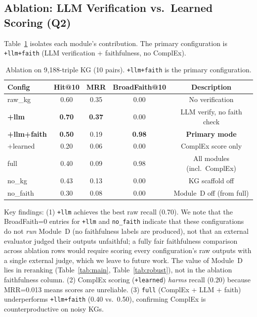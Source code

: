 \subsection{Ablation: LLM Verification vs.\ Learned Scoring (Q2)}
\label{sec:exp:ablation}

Table~\ref{tab:ablation} isolates each module's contribution. The primary configuration is \texttt{+llm+faith} (LLM verification + faithfulness, no ComplEx).

\begin{table}[tb]
  \centering
  \caption{Ablation on 9{,}188-triple KG (10 pairs). \texttt{+llm+faith} is the primary configuration.}
  \label{tab:ablation}
  \small
  \begin{tabular}{lcccc}
    \toprule
    Config & Hit@10 & MRR & BroadFaith@10 & Description \\
    \midrule
    raw\_kg & 0.60 & 0.35 & 0.00 & No verification \\
    \textbf{+llm} & \textbf{0.70} & \textbf{0.37} & 0.00 & LLM verify, no faith check \\
    \textbf{+llm+faith} & \textbf{0.50} & 0.19 & \textbf{0.98} & \textbf{Primary mode} \\
    +learned & 0.20 & 0.06 & 0.00 & ComplEx score only \\
    full & 0.40 & 0.09 & 0.98 & All modules (incl.\ ComplEx) \\
    no\_kg & 0.43 & 0.13 & 0.00 & KG scaffold off \\
    no\_faith & 0.30 & 0.08 & 0.00 & Module~D off (from full) \\
    \bottomrule
  \end{tabular}
\end{table}

Key findings: (1) \texttt{+llm} achieves the best raw recall (0.70). We note that the BroadFaith=0 entries for \texttt{+llm} and \texttt{no\_faith} indicate that these configurations do not \emph{run} Module~D (no faithfulness labels are produced), not that an external evaluator judged their outputs unfaithful; a fully fair faithfulness comparison across ablation rows would require scoring every configuration's raw outputs with a single external judge, which we leave to future work. The value of Module~D lies in reranking (Table~\ref{tab:main}, Table~\ref{tab:robust}), not in the ablation faithfulness column. (2) ComplEx scoring (\texttt{+learned}) \emph{harms} recall (0.20) because MRR=0.013 means scores are unreliable. (3) \texttt{full} (ComplEx + LLM + faith) underperforms \texttt{+llm+faith} (0.40 vs.\ 0.50), confirming ComplEx is counterproductive on noisy KGs.

